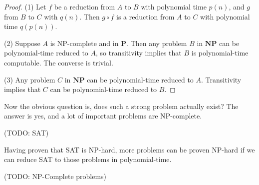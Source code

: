         \begin{proof}
            (1) Let $f$ be a reduction from $A$ to $B$ with polynomial time $p(n)$, and $g$ from $B$ to $C$ with $q(n)$. Then $g \circ f$ is a reduction from $A$ to $C$ with polynomial time $q(p(n))$.
            
            (2) Suppose $A$ is NP-complete and in $\mathbf{P}$. Then any problem $B$ in $\mathbf{NP}$ can be polynomial-time reduced to $A$, so transitivity implies that $B$ is polynomial-time computable. The converse is trivial.
            
            (3) Any problem $C$ in $\mathbf{NP}$ can be polynomial-time reduced to $A$. Transitivity implies that $C$ can be polynomial-time reduced to $B$.
        \end{proof}
        
        Now the obvious question is, does such a strong problem actually exist? The answer is yes, and a lot of important problems are NP-complete.
        
        (TODO: SAT)
        
        Having proven that SAT is NP-hard, more problems can be proven NP-hard if we can reduce SAT to those problems in polynomial-time.
        
        (TODO: NP-Complete problems)
        
